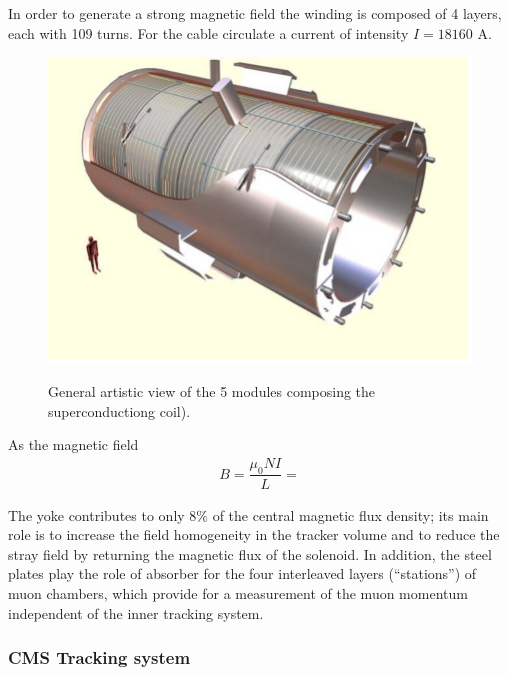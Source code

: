 In order to generate a strong magnetic field the winding is composed of 4 layers, each with 109 turns. For the cable circulate a current of intensity $I= 18160$ A.	 

\begin{figure}[H]
  \centering
\includegraphics[width=12cm]{CMS_chapter_plots/coil}
\label{fig:coil}\caption{General artistic view of the 5 modules composing the superconductiong coil).}
\end{figure}

As the magnetic field
\begin{eqnarray}
B = \dfrac{\mu_{0} N I}{L} = 
\end{eqnarray}



The yoke contributes to only 8$\%$ of the central magnetic flux density; its main role
is to increase the field homogeneity in the tracker volume and to reduce the stray field by returning
the magnetic flux of the solenoid. In addition, the steel plates play the role of absorber for the four
interleaved layers (“stations”) of muon chambers, which provide for a measurement of the muon
momentum independent of the inner tracking system.




\subsubsection{CMS Tracking system}

